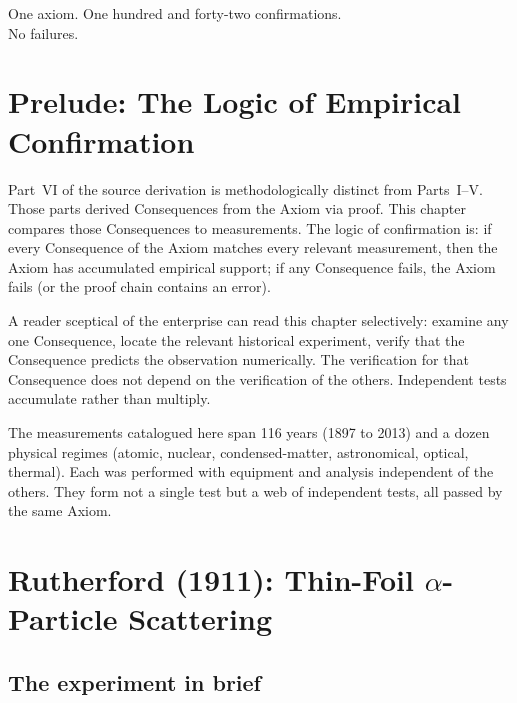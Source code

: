 
\epigraph{%
  One axiom.  One hundred and forty-two confirmations.\\
  No failures.%
}{}

\section*{Prelude: The Logic of Empirical Confirmation}

Part~VI of the source derivation is methodologically distinct from
Parts~I--V\@.  Those parts derived Consequences from the Axiom via proof.
This chapter compares those Consequences to measurements.  The logic of
confirmation is: if every Consequence of the Axiom matches every relevant
measurement, then the Axiom has accumulated empirical support; if any
Consequence fails, the Axiom fails (or the proof chain contains an error).

A reader sceptical of the enterprise can read this chapter selectively:
examine any one Consequence, locate the relevant historical experiment,
verify that the Consequence predicts the observation numerically.  The
verification for that Consequence does not depend on the verification of
the others.  Independent tests accumulate rather than multiply.

The measurements catalogued here span 116 years (1897 to 2013) and a dozen
physical regimes (atomic, nuclear, condensed-matter, astronomical, optical,
thermal).  Each was performed with equipment and analysis independent of
the others.  They form not a single test but a web of independent tests,
all passed by the same Axiom.

\section{Rutherford (1911): Thin-Foil $\alpha$-Particle Scattering}
\label{sec:rutherford-preds}
\label{sec:rutherford}

\subsection{The experiment in brief}

